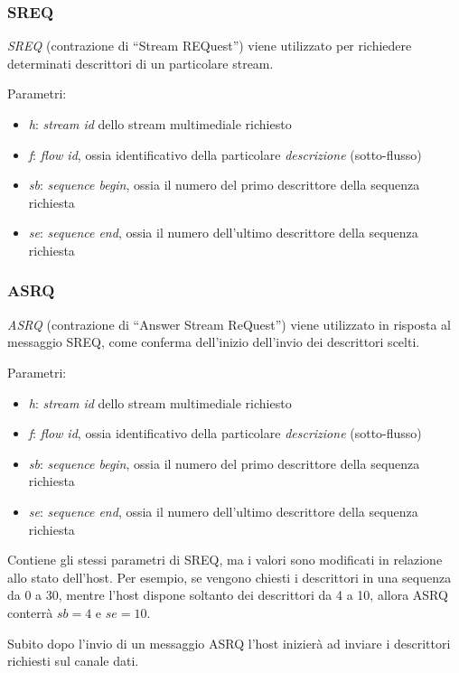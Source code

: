 \subsubsection*{SREQ}
%
\emph{SREQ} (contrazione di ``Stream REQuest'') viene utilizzato per richiedere
determinati descrittori di un particolare stream.

Parametri:
\begin{itemize}
  \item \emph{h}: \emph{stream id} dello stream multimediale richiesto
  \item \emph{f}: \emph{flow id}, ossia identificativo della particolare
  \emph{descrizione} (sotto-flusso)
  \item \emph{sb}: \emph{sequence begin}, ossia il numero del primo descrittore
  della sequenza richiesta
  \item \emph{se}: \emph{sequence end}, ossia il numero dell'ultimo descrittore
  della sequenza richiesta
\end{itemize}


\subsubsection*{ASRQ}
%
\emph{ASRQ} (contrazione di ``Answer Stream ReQuest'') viene utilizzato in
risposta al messaggio SREQ, come conferma dell'inizio dell'invio dei
descrittori scelti. 

Parametri:
\begin{itemize}
  \item \emph{h}: \emph{stream id} dello stream multimediale richiesto
  \item \emph{f}: \emph{flow id}, ossia identificativo della particolare
  \emph{descrizione} (sotto-flusso)
  \item \emph{sb}: \emph{sequence begin}, ossia il numero del primo descrittore
  della sequenza richiesta
  \item \emph{se}: \emph{sequence end}, ossia il numero dell'ultimo descrittore
  della sequenza richiesta
\end{itemize}

Contiene gli stessi parametri di SREQ, ma i valori sono
modificati in relazione allo stato dell'host. Per esempio, se vengono chiesti i
descrittori in una sequenza da 0 a 30, mentre l'host dispone soltanto dei
descrittori da 4 a 10, allora ASRQ conterrà $sb=4$ e $se=10$.

Subito dopo l'invio di un messaggio ASRQ l'host inizierà ad inviare i
descrittori richiesti sul canale dati.



